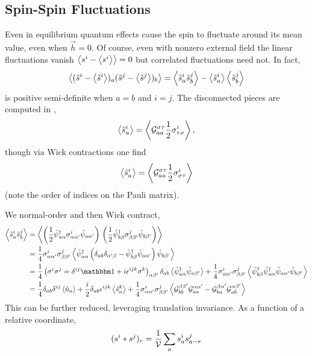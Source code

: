 \subsection{Spin-Spin Fluctuations}\label{sec:spin fluctuations}

Even in equilibrium quantum effects cause the spin to fluctuate around its mean value, even when $\vec{h}=0$.
Of course, even with nonzero external field the linear fluctuations vanish $\left\langle s^i - \left\langle s^i \right\rangle \right\rangle = 0$ but correlated fluctuations need not.
In fact,
\begin{align}
    \left\langle  (\tilde{s}^i-\left\langle \tilde{s}^i \right\rangle)_a (\tilde{s}^j-\left\langle \tilde{s}^j \right\rangle)_b  \right\rangle
    =
    \left\langle  \tilde{s}^i_a \tilde{s}^j_b  \right\rangle - \left\langle \tilde{s}^i_a \right\rangle \left\langle \tilde{s}^j_b \right\rangle
\end{align}
is positive semi-definite when $a=b$ and $i=j$.
The disconnected pieces are computed in ,
\begin{align}
	\left\langle  \tilde{s}^i_a  \right\rangle = \left\langle  \mathcal{G}^{\sigma\tau}_{aa} \frac{1}{2} \sigma^{i}_{\tau\sigma} \right\rangle,
\end{align}
though via Wick contractions one find
\begin{align}
	\left\langle  \tilde{s}^i_a  \right\rangle = \left\langle  \mathcal{G}^{\sigma\tau}_{aa} \frac{1}{2} \sigma^{i}_{\sigma\tau} \right\rangle
\end{align}
(note the order of indices on the Pauli matrix).

We normal-order and then Wick contract,
\begin{align}
	\expectation{ \tilde{s}^i_a \tilde{s}^j_b }
	&=
	\expectation{
		\left(\half \tilde{\psi}\adjoint_{a\alpha} \sigma^i_{\alpha\alpha'} \tilde{\psi}_{a\alpha'}\right)
		\,
		\left(\half \tilde{\psi}\adjoint_{b\beta}  \sigma^j_{\beta \beta' } \tilde{\psi}_{b\beta' }\right)
	}
	\nonumber\\
	&=
	\oneover{4} \sigma^i_{\alpha\alpha'} \sigma^j_{\beta \beta' }
	\expectation{
		\tilde{\psi}\adjoint_{a\alpha}
		\left(\delta_{ab}\delta_{\alpha'\beta} - \tilde{\psi}\adjoint_{b\beta} \tilde{\psi}_{a\alpha'} \right)
		\tilde{\psi}_{b\beta' }
	}
	\nonumber\\
	&=
	\oneover{4} \left(\sigma^i\sigma^j = \delta^{ij}\one + i \epsilon^{ijk}\sigma^k\right)_{\alpha\beta'} \delta_{ab}
	\expectation{
		\tilde{\psi}\adjoint_{a\alpha}
		\tilde{\psi}_{a\beta' }
	}
	+ \oneover{4} \sigma^i_{\alpha\alpha'} \sigma^j_{\beta \beta' }
	\expectation{
		\tilde{\psi}\adjoint_{b\beta}
		\tilde{\psi}\adjoint_{a\alpha}
		\tilde{\psi}_{a\alpha'}
		\tilde{\psi}_{b\beta' }
	}
	\nonumber\\
	&=
	\oneover{4}   \delta_{ab} \delta^{ij} \expectation{ \tilde{n}_a }
	+ \frac{i}{2} \delta_{ab} \epsilon^{ijk} \expectation{ \tilde{s}^k_a }
	+ \oneover{4} \sigma^i_{\alpha\alpha'} \sigma^j_{\beta \beta' }
	\expectation{
		\G_{bb}^{\beta\beta'} \G_{aa}^{\alpha\alpha'}
	-	\G_{ba}^{\beta\alpha'} \G_{ab}^{\alpha\beta'}
	}
\end{align}
This can be further reduced, leveraging translation invariance.  As a function of a relative coordinate,
\begin{align}
	(s^i*s^j)_r = \frac{1}{\mathcal{V}} \sum_a s^i_a s^j_{a-r}
\end{align}
